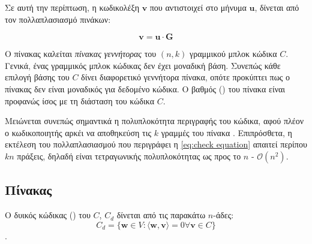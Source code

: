 Σε αυτή την περίπτωση, η κωδικολέξη $\mathbf{v}$ που αντιστοιχεί στο μήνυμα $\mathbf{u}$, δίνεται από τον πολλαπλασιασμό πινάκων: 

\begin{equation}
\mathbf{v=u \cdot G}
\label{eq:check equation}
\end{equation}

Ο πίνακας  καλείται \textit{πίνακας γεννήτορας}  του $(n,k)$ γραμμικού μπλοκ κώδικα $C$. Γενικά, ένας γραμμικός μπλοκ κώδικας δεν έχει μοναδική βάση. Συνεπώς κάθε επιλογή βάσης του $C$ δίνει διαφορετικό γεννήτορα πίνακα, οπότε προκύπτει πως ο πίνακας  δεν είναι μοναδικός για δεδομένο κώδικα. Ο βαθμός () του πίνακα  είναι προφανώς ίσος με τη διάσταση του κώδικα $C$. 

Μειώνεται συνεπώς σημαντικά η πολυπλοκότητα περιγραφής του κώδικα, αφού πλέον ο κωδικοποιητής αρκέι να αποθηκεύση τις $k$ γραμμές του πίνακα . Επιπρόσθετα, η εκτέλεση του πολλαπλασιασμού που περιγράφει η \ref{eq:check equation} απαιτεί περίπου $kn$ πράξεις, δηλαδή είναι τετραγωνικής πολυπλοκότητας ως προς το $n$ - $\mathcal{O}(n^2)$.

\subsection{Πίνακας }
\begin{definition}
Ο δυικός κώδικας () του $C$, $C_d$ δίνεται από τις παρακάτω $n$-άδες:$$C_d=\lbrace\mathbf{w}\in V:\langle \mathbf{w,v} \rangle =0 \forall \mathbf{v}\in C\rbrace$$\cite{ryan2009channel}.
\label{def:dual code}
\end{definition}

